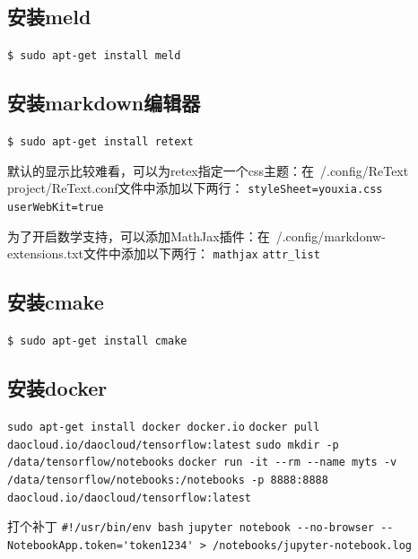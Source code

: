 \subsection{安装meld}
\verb"$ sudo apt-get install meld"

\subsection{安装markdown编辑器}
\verb"$ sudo apt-get install retext"

默认的显示比较难看，可以为retex指定一个css主题：在~/.config/ReText project/ReText.conf文件中添加以下两行：
\verb"styleSheet=youxia.css"
\verb"userWebKit=true"

为了开启数学支持，可以添加MathJax插件：在~/.config/markdonw-extensions.txt文件中添加以下两行：
\verb"mathjax"
\verb"attr_list"

\subsection{安装cmake}
\verb"$ sudo apt-get install cmake"

\subsection{安装docker}
\verb"sudo apt-get install docker docker.io"
\verb"docker pull daocloud.io/daocloud/tensorflow:latest"
\verb"sudo mkdir -p /data/tensorflow/notebooks"
\verb"docker run -it --rm --name myts -v /data/tensorflow/notebooks:/notebooks -p 8888:8888 daocloud.io/daocloud/tensorflow:latest"

打个补丁
\verb"#!/usr/bin/env bash"
\verb"jupyter notebook --no-browser --NotebookApp.token='token1234' > /notebooks/jupyter-notebook.log"
